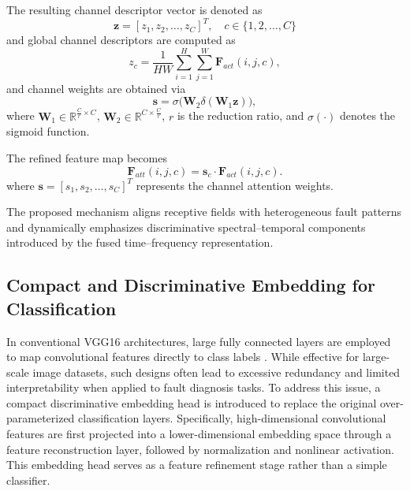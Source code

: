 \documentclass[journal]{IEEEtran}
\begin{document}
The resulting channel descriptor vector is denoted as
\begin{equation}
	\boldsymbol{z} = [z_1, z_2, \dots, z_C]^T, \quad c \in \{1,2,\dots,C\}
\end{equation}
and global channel descriptors are computed as
\begin{equation}
	z_c = \frac{1}{HW} \sum_{i=1}^{H} \sum_{j=1}^{W} \boldsymbol{F}_{act}(i, j, c),
	\label{eq:channel_embedding}
\end{equation}
and channel weights are obtained via
\begin{equation}
	\boldsymbol{s} = \sigma\big(\boldsymbol{W}_2 \delta(\boldsymbol{W}_1 \boldsymbol{z})\big),
	\label{eq:attention_score}
\end{equation}
where $\boldsymbol{W}_1 \in \mathbb{R}^{\frac{C}{r}\times C}$, $\boldsymbol{W}_2 \in \mathbb{R}^{C\times \frac{C}{r}}$, $r$ is the reduction ratio, and $\sigma(\cdot)$ denotes the sigmoid function. 

The refined feature map becomes
\begin{equation}
	\boldsymbol{F}_{att}(i,j,c) = \boldsymbol{s}_c \cdot \boldsymbol{F}_{act}(i,j,c).
	\label{eq:attention_feature}
\end{equation}
where $\boldsymbol{s} = [s_1, s_2, \dots, s_C]^T$ represents the
channel attention weights.

The proposed mechanism aligns receptive fields with heterogeneous fault patterns and dynamically emphasizes discriminative spectral–temporal components introduced by the fused time–frequency representation.

\subsection{Compact and Discriminative Embedding for Classification}
In conventional VGG16 architectures, large fully connected layers are employed to map convolutional features directly to class labels \cite{9770845}. While effective for large-scale image datasets, such designs often lead to excessive redundancy and limited interpretability when applied to fault diagnosis tasks. To address this issue, a compact discriminative embedding head is introduced to replace the original over-parameterized classification layers. Specifically, high-dimensional convolutional features are first projected into a lower-dimensional embedding space through a feature reconstruction layer, followed by normalization and nonlinear activation. This embedding head serves as a feature refinement stage rather than a simple classifier.
\end{document}
